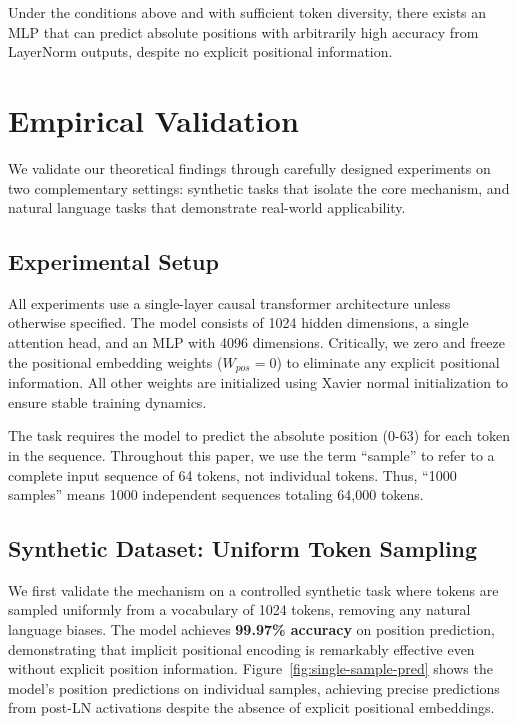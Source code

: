\documentclass[11pt]{article}
\begin{document}
\begin{theorem}
Under the conditions above and with sufficient token diversity, there exists an MLP that can predict absolute positions with arbitrarily high accuracy from LayerNorm outputs, despite no explicit positional information.
\end{theorem}

\section{Empirical Validation}

We validate our theoretical findings through carefully designed experiments on two complementary settings: synthetic tasks that isolate the core mechanism, and natural language tasks that demonstrate real-world applicability.

\subsection{Experimental Setup}

All experiments use a single-layer causal transformer architecture unless otherwise specified. The model consists of 1024 hidden dimensions, a single attention head, and an MLP with 4096 dimensions. Critically, we zero and freeze the positional embedding weights ($W_{pos} = 0$) to eliminate any explicit positional information. All other weights are initialized using Xavier normal initialization to ensure stable training dynamics.

The task requires the model to predict the absolute position (0-63) for each token in the sequence. Throughout this paper, we use the term ``sample'' to refer to a complete input sequence of 64 tokens, not individual tokens. Thus, ``1000 samples'' means 1000 independent sequences totaling 64,000 tokens.

\subsection{Synthetic Dataset: Uniform Token Sampling}

We first validate the mechanism on a controlled synthetic task where tokens are sampled uniformly from a vocabulary of 1024 tokens, removing any natural language biases. The model achieves \textbf{99.97\% accuracy} on position prediction, demonstrating that implicit positional encoding is remarkably effective even without explicit position information. Figure~\ref{fig:single-sample-pred} shows the model's position predictions on individual samples, achieving precise predictions from post-LN activations despite the absence of explicit positional embeddings.
\end{document}
